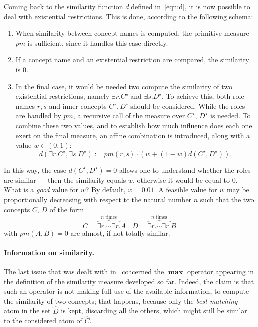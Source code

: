 Coming back to the similarity function \(d\) defined in~\eqref{eqn:d}, it is now possible to deal with existential restrictions.
This is done, according to the following schema:

\begin{enumerate}
  \item When similarity between concept names is computed, the primitive measure \(pm\) is sufficient, since it handles this case directly.
  \item If a concept name and an existential restriction are compared, the similarity is \(0\).
  \item In the final case, it would be needed two compute the similarity of two existential restrictions, namely \(\exists{}r.C^\star{}\) and \(\exists{}s.D^\star{}\).
  To achieve this, both role names \(r,s\) and inner concepts \(C^\star,D^\star\) should be considered.
  While the roles are handled by \(pm\), a recursive call of the measure over \(C^\star\), \(D^\star\) is needed.
  To combine these two values, and to establish how much influence does each one exert on the final measure, an affine combination is introduced, along with a value \(w \in (0,1)\):
  \[
  d(\exists{}r.C^\star,\exists{}s.D^\star) :=
  pm(r,s) \cdot \left(w + (1-w)d(C^\star,D^\star)\right).
  \]
\end{enumerate}
  In this way, the case \(d(C^\star,D^\star) = 0\) allows one to understand whether the roles are similar --- then the similarity equals \(w\), otherwise it would be equal to \(0\).
  What is a \emph{good} value for \(w\)? By default, \(w = 0.01\).
  A feasible value for \(w\) may be proportionally decreasing with respect to the natural number \(n\) such that the two concepts \(C\), \(D\) of the form
  \[
  C = \overbrace{\exists{}r.\dotsb{}\exists{}r.}^{n\;\text{times}}A \quad
  D = \overbrace{\exists{}r.\dotsb{}\exists{}r.}^{n\;\text{times}}B
  \]
  with \(pm(A,B) = 0\) are almost, if not totally similar.

  \paragraph{Information on similarity.}
  The last issue that was dealt with in~\cite{LeTu12} concerned the \(\mathbf{\max}\) operator appearing in the definition of the similarity measure developed so far.
  Indeed, the claim is that such an operator is not making full use of the available information, to compute the similarity of two concepts; that happens, because only the \emph{best matching} atom in the set \(\widehat{D}\) is kept, discarding all the others, which might still be similar to the considered atom of \(\widehat{C}\).

